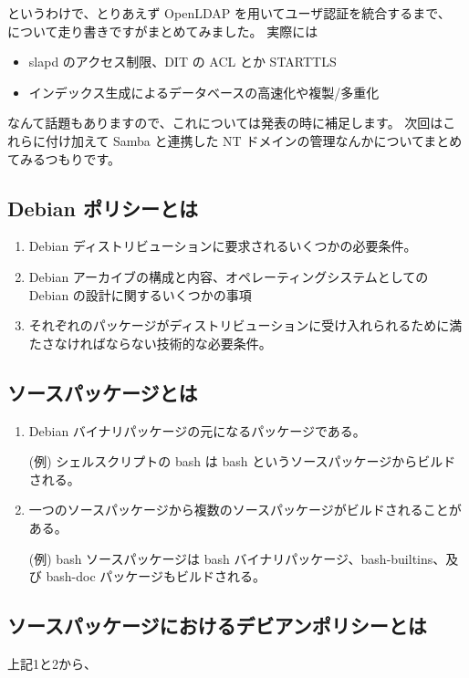 \documentclass[mingoth,a4paper]{jsarticle}
\begin{document}
というわけで、とりあえず OpenLDAP を用いてユーザ認証を統合するまで、
について走り書きですがまとめてみました。
実際には
\begin{itemize}
\item slapd のアクセス制限、DIT の ACL とか STARTTLS
\item インデックス生成によるデータベースの高速化や複製/多重化
\end{itemize}
なんて話題もありますので、これについては発表の時に補足します。
次回はこれらに付け加えて
Samba と連携した NT ドメインの管理なんかについてまとめてみるつもりです。

\clearpage


\subsection {Debian ポリシーとは}
\begin{enumerate}
\item Debian ディストリビューションに要求されるいくつかの必要条件。
\item Debian アーカイブの構成と内容、オペレーティングシステムとしての Debian の設計に関するいくつかの事項
\item それぞれのパッケージがディストリビューションに受け入れられるために満たさなければならない技術的な必要条件。
\end{enumerate}

\subsection{ソースパッケージとは}
\begin{enumerate}
\item Debian バイナリパッケージの元になるパッケージである。

  (例)  シェルスクリプトの bash は bash というソースパッケージからビルドされる。
\item 一つのソースパッケージから複数のソースパッケージがビルドされることがある。

  (例)  bash ソースパッケージは bash バイナリパッケージ、bash-builtins、及び bash-doc パッケージもビルドされる。
\end{enumerate}

\subsection{ソースパッケージにおけるデビアンポリシーとは}
上記1と2から、
\end{document}
